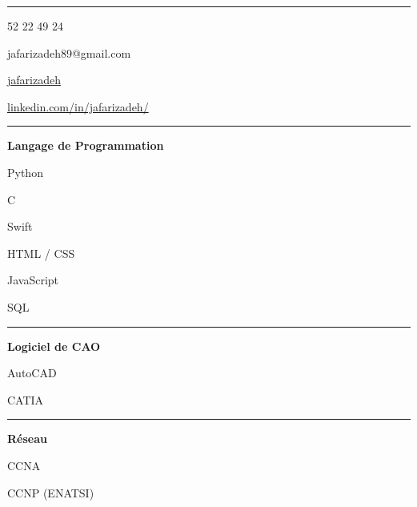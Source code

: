 \documentclass{letter}
\newcommand{\divider}{\rule{\linewidth}{0.9pt}}
\begin{document}
\small
\begin{minipage}[t]{0.40\textwidth}
\setlength{\baselineskip}{1.5\baselineskip}
\color{white}
\vspace{5mm}



\vspace{5mm}

\divider


\faPhone {} 52 22 49 24

\faEnvelope \quad jafarizadeh89@gmail.com

\faGithub \quad \href{https://github.com/jafarizadeh}{jafarizadeh}

\faLinkedin \quad \href{https://www.linkedin.com/in/jafarizadeh/}{linkedin.com/in/jafarizadeh/}


\divider


{\large \textbf{Langage de Programmation}}

\faCircleNotch \quad Python

\faCircleNotch \quad C

\faCircleNotch \quad Swift

\faCircleNotch \quad HTML / CSS

\faCircleNotch \quad JavaScript

\faCircleNotch \quad SQL

\divider


{\large \textbf{Logiciel de CAO}}

\faCircleNotch \quad AutoCAD

\faCircleNotch \quad CATIA

\divider



{\large \textbf{Réseau}}

\faNetworkWired \quad CCNA

\faNetworkWired \quad CCNP (ENATSI)

\end{minipage}
\end{document}

